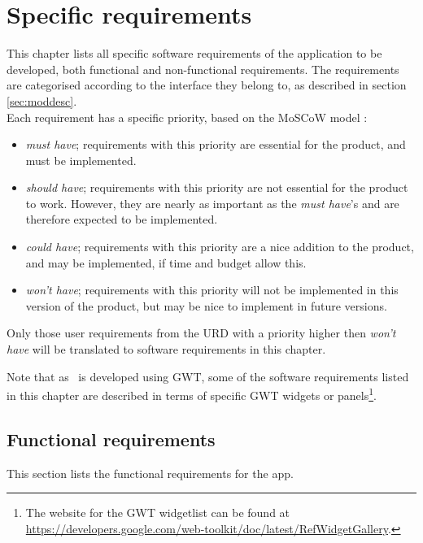 \chapter{Specific requirements}
\label{chap:specreq}
This chapter lists all specific software requirements of the application to be developed, both functional and non-functional requirements. The requirements are categorised according to the interface they belong to, as described in section \ref{sec:moddesc}. \\
Each requirement has a specific priority, based on the MoSCoW model \cite{moscow}:

\begin{itemize}
    \item \emph{must have}; requirements with this priority are essential for the product, and must be implemented.
    \item \emph{should have}; requirements with this priority are not essential for the product to work. However, they are nearly as important as the \emph{must have}'s and are therefore expected to be implemented.
    \item \emph{could have}; requirements with this priority are a nice addition to the product, and may be implemented, if time and budget allow this.
    \item \emph{won't have}; requirements with this priority will not be implemented in this version of the product, but may be nice to implement in future versions.
\end{itemize}

Only those user requirements from the URD \cite{urd} with a priority higher then \emph{won't have} will be translated to software requirements in this chapter.

Note that as \applicationname\ is developed using GWT, some of the software requirements listed in this chapter are described in terms of specific GWT widgets or panels\footnote{The website for the GWT widgetlist can be found at \url{https://developers.google.com/web-toolkit/doc/latest/RefWidgetGallery}.}.


\section{Functional requirements}
This section lists the functional requirements for the \projectname app.

